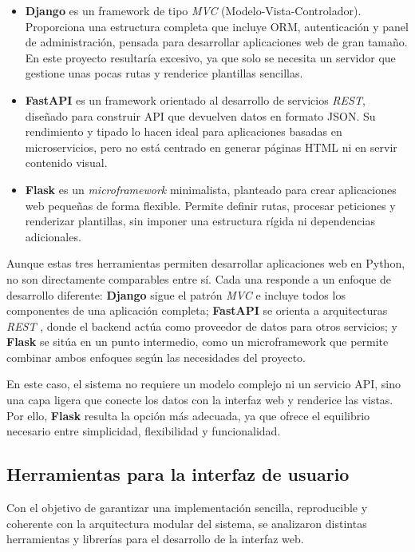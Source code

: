 \begin{itemize}
    \item \textbf{Django} es un framework de tipo \textit{MVC} (Modelo-Vista-Controlador). 
    Proporciona una estructura completa que incluye ORM, autenticación y panel de administración, 
    pensada para desarrollar aplicaciones web de gran tamaño. En este proyecto resultaría excesivo, 
    ya que solo se necesita un servidor que gestione unas pocas rutas y renderice plantillas sencillas.
    \item \textbf{FastAPI} es un framework orientado al desarrollo de servicios \textit{REST}, 
    diseñado para construir API que devuelven datos en formato JSON. Su rendimiento y tipado lo hacen 
    ideal para aplicaciones basadas en microservicios, pero no está centrado en generar páginas HTML ni 
    en servir contenido visual.
    \item \textbf{Flask} es un \textit{microframework} minimalista, planteado para crear aplicaciones web 
    pequeñas de forma flexible. Permite definir rutas, procesar peticiones y renderizar plantillas, sin 
    imponer una estructura rígida ni dependencias adicionales.
\end{itemize}

Aunque estas tres herramientas permiten desarrollar aplicaciones web en Python, no son directamente 
comparables entre sí. Cada una responde a un enfoque de desarrollo diferente: \textbf{Django} sigue el 
patrón \textit{MVC} \cite{reenskaug1979mvc} e incluye todos los componentes de una aplicación completa; \textbf{FastAPI} se 
orienta a arquitecturas \textit{REST} \cite{fielding2000rest}, donde el backend actúa como proveedor de datos para otros servicios; 
y \textbf{Flask} se sitúa en un punto intermedio, como un microframework que permite combinar ambos 
enfoques según las necesidades del proyecto.  

En este caso, el sistema no requiere un modelo complejo ni un servicio API, sino una capa ligera que 
conecte los datos con la interfaz web y renderice las vistas. Por ello, \textbf{Flask} resulta la opción 
más adecuada, ya que ofrece el equilibrio necesario entre simplicidad, flexibilidad y funcionalidad.

\subsection{Herramientas para la interfaz de usuario} \label{sec:interfaz-herramientas}
Con el objetivo de garantizar una implementación sencilla, reproducible y coherente con la arquitectura modular del sistema, 
se analizaron distintas herramientas y librerías para el desarrollo de la interfaz web.

